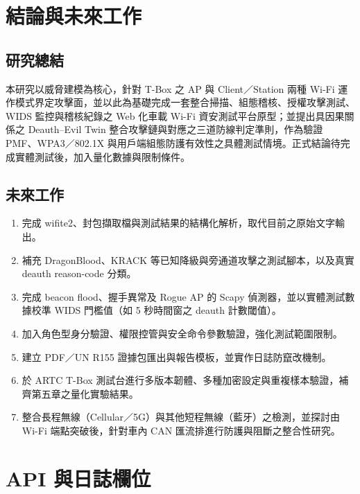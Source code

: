 \documentclass[12pt,a4paper,oneside]{report}
\begin{document}
\chapter{結論與未來工作}

\section{研究總結}
本研究以威脅建模為核心，針對 T-Box 之 AP 與 Client／Station 兩種 Wi-Fi 運作模式界定攻擊面，並以此為基礎完成一套整合掃描、組態稽核、授權攻擊測試、WIDS 監控與稽核紀錄之 Web 化車載 Wi-Fi 資安測試平台原型；並提出具因果關係之 Deauth–Evil Twin 整合攻擊鏈與對應之三道防線判定準則，作為驗證 PMF、WPA3／802.1X 與用戶端組態防護有效性之具體測試情境。正式結論待完成實體測試後，加入量化數據與限制條件。

\section{未來工作}
\begin{enumerate}
  \item 完成 wifite2、封包擷取檔與測試結果的結構化解析，取代目前之原始文字輸出。
  \item 補充 DragonBlood\cite{vanhoef2020dragonblood}、KRACK\cite{vanhoef2017krack} 等已知降級與旁通道攻擊之測試腳本，以及真實 deauth reason-code 分類。
  \item 完成 beacon flood、握手異常及 Rogue AP 的 Scapy 偵測器，並以實體測試數據校準 WIDS 門檻值（如 5 秒時間窗之 deauth 計數閾值）。
  \item 加入角色型身分驗證、權限控管與安全命令參數驗證，強化測試範圍限制。
  \item 建立 PDF／UN R155 證據包匯出與報告模板，並實作日誌防竄改機制。
  \item 於 ARTC T-Box 測試台進行多版本韌體、多種加密設定與重複樣本驗證，補齊第五章之量化實驗結果。
  \item 整合長程無線（Cellular／5G）與其他短程無線（藍牙）之檢測，並探討由 Wi-Fi 端點突破後，針對車內 CAN 匯流排進行防護與阻斷之整合性研究。
\end{enumerate}




\appendix
\chapter{API 與日誌欄位}
\end{document}
